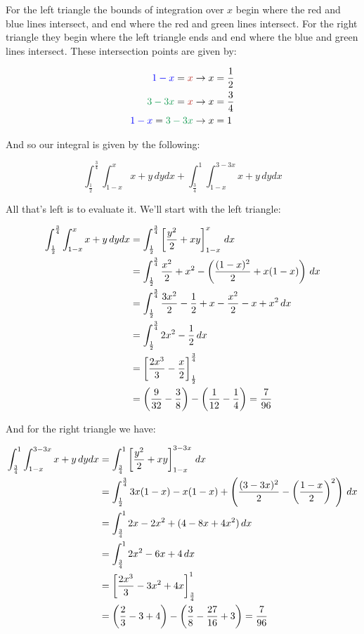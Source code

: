 \documentclass{article}
\begin{document}
For the left triangle the bounds of integration over $x$ begin where the red and blue lines intersect, and end where the red and green lines intersect. For the right triangle they begin where the left triangle ends and end where the blue and green lines intersect. These intersection points are given by:

\begin{align*}
    \textcolor{blue}{1-x}=\textcolor{BrickRed}{x}&\rightarrow x=\frac{1}{2}\\
    \textcolor{ForestGreen}{3-3x}=\textcolor{BrickRed}{x}&\rightarrow x=\frac{3}{4}\\
    \textcolor{blue}{1-x}=\textcolor{ForestGreen}{3-3x}&\rightarrow x=1
\end{align*}

And so our integral is given by the following:

$$\int^{\frac{3}{4}}_\frac{1}{2}\int^{x}_{1-x}x+y\,dydx+\int^{1}_{\frac{3}{4}}\int^{3-3x}_{1-x}x+y\,dydx$$
\pagebreak

All that's left is to evaluate it. We'll start with the left triangle:

\begin{align*}
    \int^\frac{3}{4}_\frac{1}{2}\int^{x}_{1-x}x+y\,dydx&=\int^\frac{3}{4}_\frac{1}{2}\left[\frac{y^2}{2}+xy\right]_{1-x}^{x}\,dx\\
    &=\int^\frac{3}{4}_\frac{1}{2}\frac{x^2}{2}+x^2-\left(\frac{(1-x)^2}{2}+x(1-x)\right)\,dx\\
    &=\int^\frac{3}{4}_\frac{1}{2}\frac{3x^2}{2}-\frac{1}{2}+x-\frac{x^2}{2}-x+x^2\,dx\\
    &=\int^\frac{3}{4}_\frac{1}{2}2x^2-\frac{1}{2}\,dx\\
    &=\left[\frac{2x^3}{3}-\frac{x}{2}\right]_{\frac{1}{2}}^{\frac{3}{4}}\\
    &=\left(\frac{9}{32}-\frac{3}{8}\right)-\left(\frac{1}{12}-\frac{1}{4}\right)=\frac{7}{96}
\end{align*}

And for the right triangle we have:

\begin{align*}
    \int^{1}_{\frac{3}{4}}\int^{3-3x}_{1-x}x+y\,dydx&=\int^1_\frac{3}{4}\left[\frac{y^2}{2}+xy\right]_{1-x}^{3-3x}\,dx\\
    &=\int^\frac{3}{4}_\frac{1}{2}3x(1-x)-x(1-x)+\left(\frac{(3-3x)^2}{2}-\left(\frac{1-x}{2}\right)^2\right)\,dx\\
    &=\int^1_\frac{3}{4}2x-2x^2+(4-8x+4x^2)\,dx\\
    &=\int^1_\frac{3}{4}2x^2-6x+4\,dx\\
    &=\left[\frac{2x^3}{3}-3x^2+4x\right]_{\frac{3}{4}}^{1}\\
    &=\left(\frac{2}{3}-3+4\right)-\left(\frac{3}{8}-\frac{27}{16}+3\right)=\frac{7}{96}
\end{align*}
\end{document}
